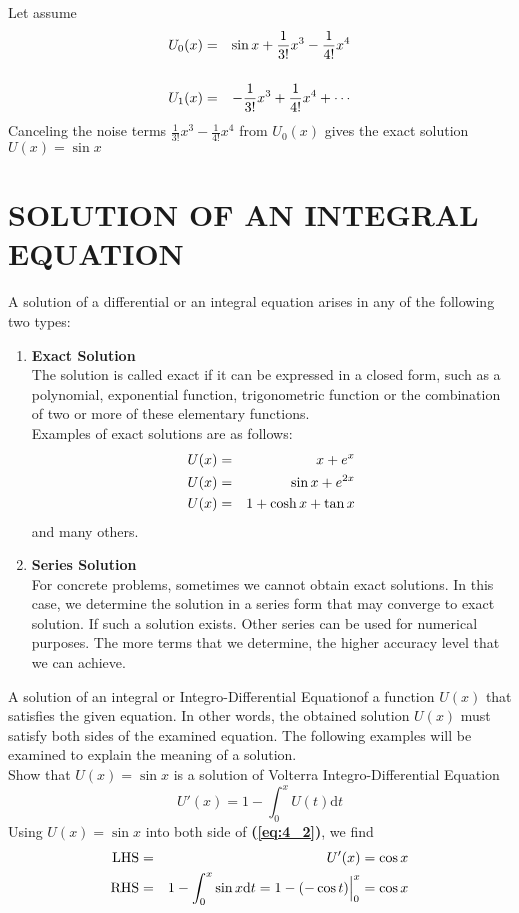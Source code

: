 \documentclass[12pt]{report}
\newcommand{\bt}[1]{\textbf{#1}}
\newcommand{\spn}[1]{\\[#1cm]}
\newcommand{\refn}[1]{\textbf{(\ref{#1})}}
\newcommand{\NI}{\noindent}
\newcommand{\dsp}{\displaystyle}
\newcommand{\IDE}{Integro-Differential Equation}
\begin{document}
	\NI Let assume 
	\begin{eqnarray}
		U_0(x) &=& \sin x + \frac{1}{3!}x^3 - \frac{1}{4!}x^4\notag \spn{0.5}
		U_1(x) &=& -\frac{1}{3!}x^3 + \frac{1}{4!}x^4 + \cdots \notag
	\end{eqnarray}
	\newpage
	Canceling the noise terms $\dsp \frac{1}{3!}x^3 - \frac{1}{4!}x^4$ from $U_0(x)$ gives the exact solution $U(x) = \sin x$
	
	\section{SOLUTION OF AN INTEGRAL EQUATION}
	A solution of a differential or an integral equation arises in any of the following two types:
	\begin{enumerate}
		\item \bt{Exact Solution}\\
		The solution is called exact if it can be expressed in a closed form, such as a polynomial, exponential function, trigonometric function or the combination of two or more of these elementary functions.\\
		Examples of exact solutions are as follows:
		\begin{eqnarray}
			U(x) &=& x + e^x \notag\\
			U(x) &=& \sin x + e^{2x} \notag\\
			U(x) &=& 1 + \cosh x + \tan x \notag
		\end{eqnarray}
		and many others.\\
		
		\item \bt{Series Solution}\\
		For concrete problems, sometimes we cannot obtain exact solutions. In this case, we determine the solution in a series form that may converge to exact solution. If such a solution exists. Other series can be used for numerical purposes. The more terms that we determine, the higher accuracy level that we can achieve.\\
	\end{enumerate}
	A solution of an integral or \IDE of a function $U(x)$ that satisfies the given equation. In other words, the obtained solution $U(x)$ must satisfy both sides of the examined equation. The following examples will be examined to explain the meaning of a solution.\\
	
	\NI Show that $U(x) = \sin x$ is a solution of Volterra \IDE
	\begin{equation}
		U'(x) = 1 - \int_0^x U(t)\text{d}t \label{eq:4_2}
	\end{equation}
	Using $U(x) = \sin x$ into both side of \refn{eq:4_2}, we find
	\begin{eqnarray}
		\text{LHS} &=& U'(x) = \cos x \notag \\
		\text{RHS} &=& 1 - \int_0^x \sin x \text{d}t = 1 - (-\cos t)\Big|_0^x = \cos x \notag
	\end{eqnarray}
	
\end{document}
